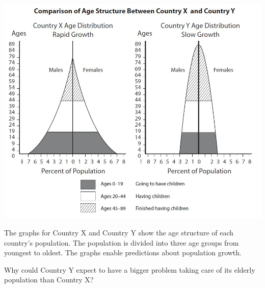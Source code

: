 \documentclass[12pt]{article}
\begin{document}
\includegraphics[max width=\textwidth]{2024_02_20_828ebc9d68bcc1fbb223g-87}

The graphs for Country $\mathrm{X}$ and Country $\mathrm{Y}$ show the age structure of each country's population. The population is divided into three age groups from youngest to oldest. The graphs enable predictions about population growth.

Why could Country Y expect to have a bigger problem taking care of its elderly population than Country X?
\end{document}
